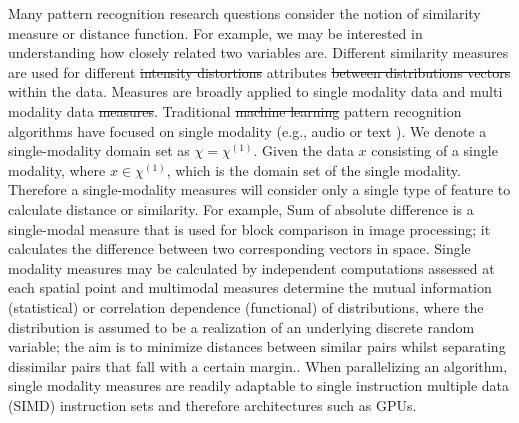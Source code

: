 \documentclass[10pt]{article}[draft]
\begin{document}
		Many pattern recognition research questions consider the notion of similarity measure or distance function. For example, we may be interested in understanding how closely related two variables are. Different similarity measures are used for different \st{intensity distortions} attributes \st{between distributions vectors} within the data. Measures are broadly applied to single modality data and multi modality data \st{measures}.  Traditional \st{machine learning} pattern recognition algorithms have focused on single modality (e.g., audio  or text ). We denote a single-modality domain set as $\chi =  \chi^{(1)} $. Given the data $x$ consisting of a single modality, where $x \in \chi^{(1)}$, which is the domain set of the single modality.  Therefore a single-modality measures will consider only a single type of feature to calculate distance or similarity.  For example, Sum of absolute difference is a single-modal measure that is used for block comparison in image processing; it calculates the difference between two corresponding vectors in space. Single modality measures may be calculated by independent computations assessed at each spatial point and multimodal measures determine the mutual information (statistical) or correlation dependence (functional) of distributions, where the  distribution is assumed to be a realization of an underlying discrete random variable; the aim is to minimize distances between similar pairs whilst separating dissimilar pairs that fall with a certain margin.. When parallelizing an algorithm, single modality measures are readily adaptable to single instruction multiple data (SIMD) instruction sets and therefore architectures such as GPUs.  
		
\end{document}
